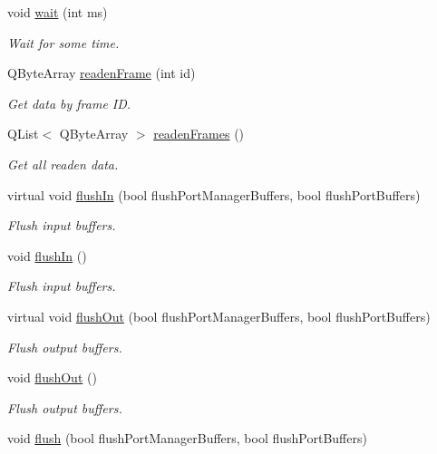 \begin{DoxyCompactItemize}
void \hyperlink{classmdt_port_manager_aaa85e0200aba0e0f4392dfe01abae2cf}{wait} (int ms)
\begin{DoxyCompactList}\small\item\em Wait for some time. \end{DoxyCompactList}\item 
QByteArray \hyperlink{classmdt_port_manager_a830ae182d06dd6a52c43a7f45b9240ac}{readenFrame} (int id)
\begin{DoxyCompactList}\small\item\em Get data by frame ID. \end{DoxyCompactList}\item 
QList$<$ QByteArray $>$ \hyperlink{classmdt_port_manager_addd5dcae9644cea42a9871205af41796}{readenFrames} ()
\begin{DoxyCompactList}\small\item\em Get all readen data. \end{DoxyCompactList}\item 
virtual void \hyperlink{classmdt_port_manager_ac0844a5cd4043a95a479d458ac7ce590}{flushIn} (bool flushPortManagerBuffers, bool flushPortBuffers)
\begin{DoxyCompactList}\small\item\em Flush input buffers. \end{DoxyCompactList}\item 
void \hyperlink{classmdt_port_manager_a4c44ce6ec40c4afc6be441c10d7ee827}{flushIn} ()
\begin{DoxyCompactList}\small\item\em Flush input buffers. \end{DoxyCompactList}\item 
virtual void \hyperlink{classmdt_port_manager_a3f0c2722a41c49de2bea9013bccd049c}{flushOut} (bool flushPortManagerBuffers, bool flushPortBuffers)
\begin{DoxyCompactList}\small\item\em Flush output buffers. \end{DoxyCompactList}\item 
void \hyperlink{classmdt_port_manager_ab34018a9653a5af784fa7da06a9e50d3}{flushOut} ()
\begin{DoxyCompactList}\small\item\em Flush output buffers. \end{DoxyCompactList}\item 
void \hyperlink{classmdt_port_manager_a97b91e7c1641836eb6afb47fd244a18e}{flush} (bool flushPortManagerBuffers, bool flushPortBuffers)

\end{DoxyCompactItemize}
